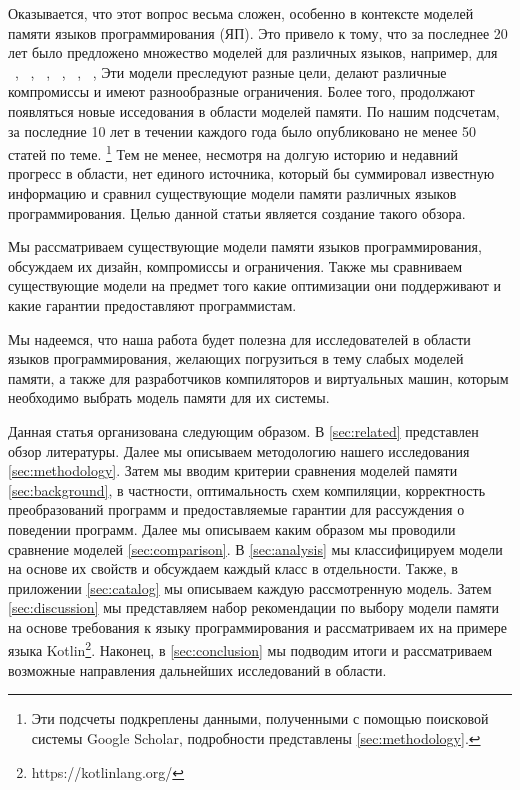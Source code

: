 Оказывается, что этот вопрос весьма сложен, 
особенно в контексте моделей памяти языков программирования (ЯП).
Это привело к тому, что за последнее 20 лет было предложено 
множество моделей для различных языков, например, для 
\Java~\cite{Manson-al:POPL05, Bender-Palsberg:OOPSLA19}, \CPP~\cite{Batty-al:POPL11}, 
\LLVM~\cite{Chakraborty-Vafeiadis:CGO17}, \JS~\cite{Watt-al:PLDI2020}, 
\OCaml~\cite{Manson-al:POPL05}, \Haskell~\cite{Vollmer-al:PPoPP17}, \etc
Эти модели преследуют разные цели, делают различные компромиссы
и имеют разнообразные ограничения.
Более того, продолжают появляться новые исседования в области моделей памяти. 
По нашим подсчетам, за последние 10 лет в течении 
каждого года было опубликовано не менее 50 статей по теме.%
\footnote{Эти подсчеты подкреплены данными, полученными 
с помощью поисковой системы Google Scholar, 
подробности представлены \cref{sec:methodology}.}
Тем не менее, несмотря на долгую историю и недавний прогресс в области,
нет единого источника, который бы суммировал 
известную информацию и сравнил существующие 
модели памяти различных языков программирования. 
Целью данной статьи является создание такого обзора. 

Мы рассматриваем существующие модели памяти языков программирования, 
обсуждаем их дизайн, компромиссы и ограничения. 
Также мы сравниваем существующие модели на предмет того
какие оптимизации они поддерживают 
и какие гарантии предоставляют программистам. 

Мы надеемся, что наша работа будет полезна для 
исследователей в области языков программирования, 
желающих погрузиться в тему слабых моделей памяти, 
а также для разработчиков компиляторов и виртуальных машин, 
которым необходимо выбрать модель памяти для их системы.

Данная статья организована следующим образом. 
В \cref{sec:related} представлен обзор литературы. 
Далее мы описываем методологию нашего исследования \cref{sec:methodology}.
Затем мы вводим критерии сравнения моделей памяти \cref{sec:background}, 
в частности, оптимальность схем компиляции, 
корректность преобразований программ
и предоставляемые гарантии для рассуждения 
о поведении программ.  
Далее мы описываем каким образом мы проводили 
сравнение моделей \cref{sec:comparison}. 
В \cref{sec:analysis} мы классифицируем модели на основе их свойств
и обсуждаем каждый класс в отдельности. 
Также, в приложении \ref{sec:catalog} мы описываем каждую рассмотренную модель. 
Затем \cref{sec:discussion} мы представляем набор рекомендации 
по выбору модели памяти на основе требования к языку программирования 
и рассматриваем их на примере языка Kotlin\footnote{https://kotlinlang.org/}.
Наконец, в \cref{sec:conclusion} мы подводим итоги 
и рассматриваем возможные направления дальнейших исследований в области.
